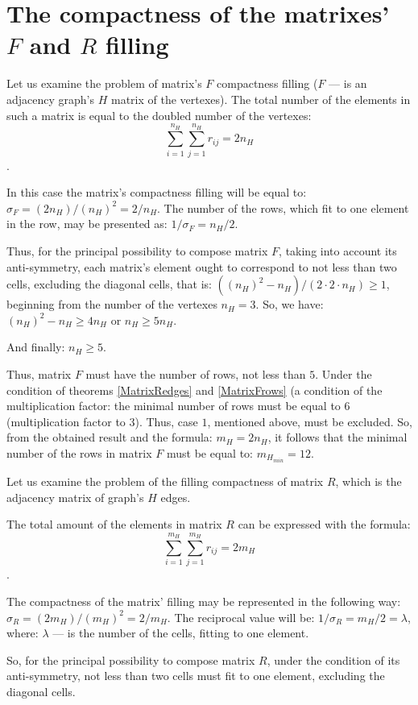 \documentclass{amsart}
\theoremstyle{plain}
\numberwithin{equation}{section}
\begin{document}
\section {The compactness of the matrixes' $F$ and $R$ filling}

Let us examine the problem of matrix's $F$ compactness filling ($F$ --- is an adjacency graph's $H$ matrix of the vertexes). The total number of the elements in such a matrix is equal to the doubled number of the vertexes:
 $$\sum_{i=1}^{n_H}\sum_{j=1}^{n_H}r_{ij}=2n_H$$.

In this case the matrix's compactness filling will be equal to: $\sigma_F=(2n_H)/(n_H )^2 =2/n_H $.
The number of the rows, which fit to one element in the row, may be presented as:  $1/\sigma_F =n_H/2$.

Thus, for the principal possibility to compose matrix $F$, taking into account its anti-symmetry, each matrix's element ought to correspond to not less than two cells, excluding the diagonal cells, that is: $((n_H )^2-n_H)/(2\cdot 2\cdot n_H )\ge 1$, beginning from the number of the vertexes $n_H=3$. So, we have: $(n_H )^2-n_H\ge 4 n_H$ or $n_H\ge 5 n_H$.

And finally: $n_H\ge5$.

Thus, matrix $F$ must have the number of rows, not less than $5$. Under the condition of theorems \ref{MatrixRedges} and \ref{MatrixFrows} (a condition of the multiplication factor: the minimal number of rows must be equal to $6$ (multiplication factor to $3$). Thus, case $1$, mentioned above, must be excluded. So, from the obtained result and the formula: $m_H=2n_H$, it follows that the minimal number of the rows in matrix $F$ must be equal to: $m_{H_{min}}=12$.

Let us examine the problem of the filling compactness of matrix $R$, which is the adjacency matrix of graph's $H$ edges.

The total amount of the elements in matrix $R$ can be expressed with the formula: $$\sum_{i=1}^{m_H}\sum_{j=1}^{m_H}r_{ij}=2m_H$$.

The compactness of the matrix' filling may be represented in the following way: $\sigma_R=(2m_H)/(m_H )^2 =2/m_H$. The reciprocal value will be: $1/\sigma_R =m_H/2=\lambda$, where: $\lambda$ --- is the number of the cells, fitting to one element.

So, for the principal possibility to compose matrix $R$, under the condition of its anti-symmetry, not less than two cells must fit to one element, excluding the diagonal cells. 
\end{document}
